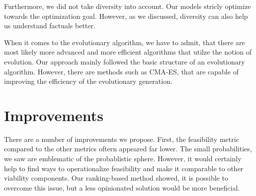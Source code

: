 \documentclass[12pt,a4paper]{report}
\begin{document}
Furthermore, we did not take diversity into account. Our models stricly optimize towards the optimization goal. However, as we discussed, diversity can also help us understand factuals better.

When it comes to the evolutionary algorithm, we have to admit, that there are most likely more advanced and more efficient algorithms that utilze the notion of evolution. Our approach mainly followed the basic structure of an evolutionary algorithm. However, there are methods such as CMA-ES, that are capable of improving the efficiency of the evolutionary generation. 




\section{Improvements}
There are a number of improvements we propose. First, the feasibility metric compared to the other metrics oftern appeared far lower. The small probabilities, we saw are emblematic of the probablistic sphere. However, it would certainly help to find ways to operationalize feasibility and make it comparable to other viability components. Our ranking-based method showed, it is possible to overcome this issue, but a less opinionated solution would be more beneficial. 
\end{document}
